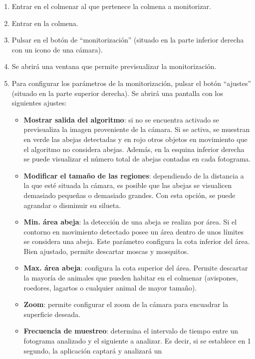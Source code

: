 \begin{enumerate}
\def\labelenumi{\arabic{enumi}.}
\tightlist
\item
  Entrar en el colmenar al que pertenece la colmena a monitorizar.
\item
  Entrar en la colmena.
\item
  Pulsar en el botón de ``monitorización'' (situado en la parte inferior
  derecha con un icono de una cámara).
\item
  Se abrirá una ventana que permite previsualizar la monitorización.
\item
  Para configurar los parámetros de la monitorización, pulsar el botón
  ``ajustes'' (situado en la parte superior derecha). Se abrirá una
  pantalla con los siguientes ajustes:

  \begin{itemize}
  \tightlist
  \item
    \textbf{Mostrar salida del algoritmo}: si no se encuentra activado
    se previsualiza la imagen proveniente de la cámara. Si se activa, se
    muestran en verde las abejas detectadas y en rojo otros objetos en
    movimiento que el algoritmo no considera abejas. Además, en la
    esquina inferior derecha se puede visualizar el número total de
    abejas contadas en cada fotograma.
  \item
    \textbf{Modificar el tamaño de las regiones}: dependiendo de la
    distancia a la que esté situada la cámara, es posible que las abejas
    se visualicen demasiado pequeñas o demasiado grandes. Con esta
    opción, se puede agrandar o disminuir su silueta.
  \item
    \textbf{Min. área abeja}: la detección de una abeja se realiza por
    área. Si el contorno en movimiento detectado posee un área dentro de
    unos límites se considera una abeja. Este parámetro configura la
    cota inferior del área. Bien ajustado, permite descartar moscas y
    mosquitos.
  \item
    \textbf{Max. área abeja}: configura la cota superior del área.
    Permite descartar la mayoría de animales que pueden habitar en el
    colmenar (avispones, roedores, lagartos o cualquier animal de mayor
    tamaño).
  \item
    \textbf{Zoom}: permite configurar el zoom de la cámara para
    encuadrar la superficie deseada.
  \item
    \textbf{Frecuencia de muestreo}: determina el intervalo de tiempo
    entre un fotograma analizado y el siguiente a analizar. Es decir, si
    se establece en 1 segundo, la aplicación captará y analizará un

\end{itemize}
\end{enumerate}
